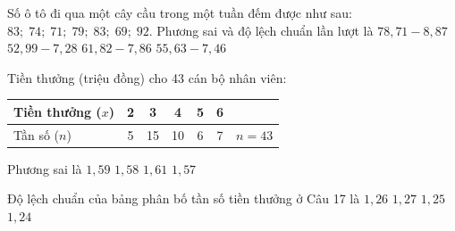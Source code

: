 \begin{ex}
	Số ô tô đi qua một cây cầu trong một tuần đếm được như sau: $83;\; 74;\; 71;\; 79;\; 83;\; 69;\; 92$. Phương sai và độ lệch chuẩn lần lượt là
	\choice
	{$78{,}71 - 8{,}87$}
	{$52{,}99 - 7{,}28$}
	{\True $61{,}82 - 7{,}86$}
	{$55{,}63 - 7{,}46$}
\end{ex}

\begin{ex}
	Tiền thưởng (triệu đồng) cho 43 cán bộ nhân viên:
	\begin{center}
	\begin{tabular}{|l|c|c|c|c|c|c|}
		\hline
		Tiền thưởng ($x$) & 2 & 3 & 4 & 5 & 6 & \\
		\hline
		Tần số ($n$) & 5 & 15 & 10 & 6 & 7 & $n = 43$ \\
		\hline
	\end{tabular}
	\end{center}
	Phương sai là
	\choice
	{\True $1{,}59$}
	{$1{,}58$}
	{$1{,}61$}
	{$1{,}57$}
\end{ex}

\begin{ex}
	Độ lệch chuẩn của bảng phân bố tần số tiền thưởng ở Câu 17 là
	\choice
	{\True $1{,}26$}
	{$1{,}27$}
	{$1{,}25$}
	{$1{,}24$}
\end{ex}


